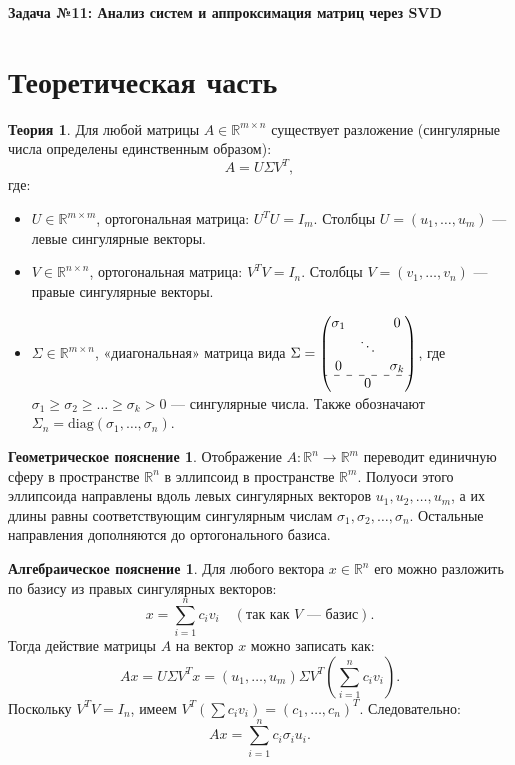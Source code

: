 \documentclass[12pt, a4paper]{article}
\theoremstyle{definition}
\newtheorem*{theory}{Теория}
\newtheorem*{geom}{Геометрическое пояснение}
\newtheorem*{alg}{Алгебраическое пояснение}
\begin{document}
\begin{center}
    \Large\bfseries Задача №11: Анализ систем и аппроксимация матриц через SVD \\
\end{center}

\vspace{0.5cm}

\section{Теоретическая часть}

\begin{theory}
Для любой матрицы $A \in \mathbb{R}^{m \times n}$ существует разложение (сингулярные числа определены единственным образом):
\[
A = U \Sigma V^T,
\]
где:
\begin{itemize}
    \item $U \in \mathbb{R}^{m \times m}$, ортогональная матрица: $U^T U = I_m$. Столбцы $U = (u_1, \dots, u_m)$ --- левые сингулярные векторы.
    \item $V \in \mathbb{R}^{n \times n}$, ортогональная матрица: $V^T V = I_n$. Столбцы $V = (v_1, \dots, v_n)$ --- правые сингулярные векторы.
    \item $\Sigma \in \mathbb{R}^{m \times n}$, «диагональная» матрица вида $\Sigma = \begin{pmatrix} \sigma_1 & & 0 \\ & \ddots & \\ 0 & & \sigma_k \\ \hdashline & 0 & \end{pmatrix}$, где $\sigma_1 \ge \sigma_2 \ge \dots \ge \sigma_k > 0$ --- сингулярные числа. Также обозначают $\Sigma_n = \text{diag}(\sigma_1, \dots, \sigma_n)$.
\end{itemize}
\end{theory}

\begin{geom}
Отображение $A \colon \mathbb{R}^n \to \mathbb{R}^m$ переводит единичную сферу в пространстве $\mathbb{R}^n$ в эллипсоид в пространстве $\mathbb{R}^m$. Полуоси этого эллипсоида направлены вдоль левых сингулярных векторов $u_1, u_2, \dots, u_m$, а их длины равны соответствующим сингулярным числам $\sigma_1, \sigma_2, \dots, \sigma_n$. Остальные направления дополняются до ортогонального базиса.
\end{geom}

\begin{alg}
Для любого вектора $x \in \mathbb{R}^n$ его можно разложить по базису из правых сингулярных векторов:
\[
x = \sum_{i=1}^n c_i v_i \quad (\text{так как } V \text{ --- базис}).
\]
Тогда действие матрицы $A$ на вектор $x$ можно записать как:
\[
Ax = U \Sigma V^T x = (u_1, \dots, u_m) \Sigma V^T \left( \sum_{i=1}^n c_i v_i \right).
\]
Поскольку $V^T V = I_n$, имеем $V^T \left( \sum c_i v_i \right) = (c_1, \dots, c_n)^T$. Следовательно:
\[
Ax = \sum_{i=1}^n c_i \sigma_i u_i.
\]
\end{alg}
\end{document}
